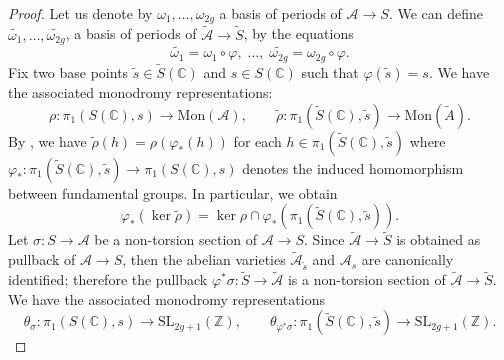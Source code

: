 \documentclass[10 pt,a4paper]{article}
\theoremstyle{plain}
\theoremstyle{definition}
\theoremstyle{named}
\newcommand{\cA}{\mathcal A}
\newcommand{\bC}{\mathbb C}
\newcommand{\bZ}{\mathbb Z}
\begin{document}
\begin{proof}
	Let us denote by $\omega_1, \ldots, \omega_{2g}$ a basis of periods of $\cA \rightarrow S$. We can define $\widetilde{\omega_1}, \ldots, \widetilde{\omega_{2g}}$, a basis of periods of $\widetilde{\cA} \rightarrow \widetilde{S}$, by the equations
	\begin{equation}\label{eqn3}
		\widetilde{\omega_1}=\omega_1 \circ \varphi,\; \ldots,\; \widetilde{\omega_{2g}}=\omega_{2g} \circ \varphi.
	\end{equation}
	Fix two base points $\widetilde{s} \in \widetilde{S}(\bC)$ and $s \in S(\bC)$ such that $\varphi(\widetilde{s})=s$. We have the associated monodromy representations:
	\[
    \rho:\pi_1(S(\bC),s) \rightarrow \textrm{Mon}(\cA), \qquad \widetilde{\rho}:\pi_1(\widetilde{S}(\bC),\widetilde{s}) \rightarrow \textrm{Mon}(\widetilde{A}).
    \]
	By , we have $\widetilde{\rho}(h)=\rho(\varphi_*(h))$ for each $h \in \pi_1(\widetilde{S}(\bC),\widetilde{s})$ where $\varphi_*:\pi_1(\widetilde{S}(\bC),\widetilde{s})\rightarrow \pi_1(S(\bC),s)$ denotes the induced homomorphism between fundamental groups. In particular, we obtain
	\begin{equation}\label{eqn3_bis}
		\varphi_*(\ker{\widetilde{\rho}})=\ker{\rho} \cap \varphi_*(\pi_1(\widetilde{S}(\bC),\widetilde{s})).
	\end{equation}
	Let $\sigma:S \rightarrow \cA$ be a non-torsion section of $\cA \rightarrow S$. Since $\widetilde{\cA}\rightarrow \widetilde{S}$ is obtained as pullback of $\cA \rightarrow S$, then the abelian varieties $\widetilde{\cA}_{\widetilde{s}}$ and $\cA_s$ are canonically identified; therefore the pullback $\varphi^*\sigma:\widetilde{S} \rightarrow \widetilde{\cA}$ is a non-torsion section of $\widetilde{\cA} \rightarrow \widetilde{S}$. We have the associated monodromy representations
	\[
    \theta_\sigma:\pi_1(S(\bC),s) \rightarrow \textrm{SL}_{2g+1}(\bZ), \qquad \theta_{\varphi^*\sigma}:\pi_1(\widetilde{S}(\bC),\widetilde{s}) \rightarrow \textrm{SL}_{2g+1}(\bZ).
    \]
		

\end{proof}
\end{document}
